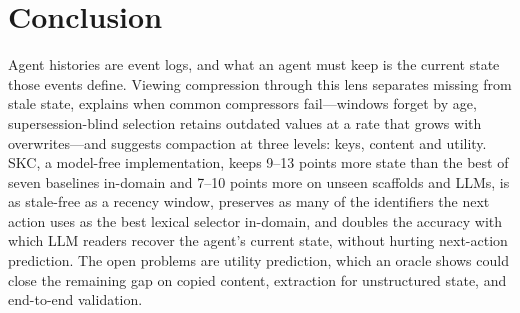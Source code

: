 \section{Conclusion}

Agent histories are event logs, and what an agent must keep is the current state
those events define. Viewing compression through this lens separates missing
from stale state, explains when common compressors fail---windows forget by age,
supersession-blind selection retains outdated values at a rate that grows with
overwrites---and suggests compaction at three levels: keys, content and
utility. SKC, a model-free implementation, keeps 9--13 points more state than the
best of seven baselines in-domain and 7--10 points more on unseen scaffolds and
LLMs, is as stale-free as a recency window, preserves as many of the identifiers
the next action uses as the best lexical selector in-domain, and doubles the
accuracy with which LLM readers recover the agent's current state, without
hurting next-action prediction. The open problems are utility prediction, which an oracle shows
could close the remaining gap on copied content, extraction for unstructured
state, and end-to-end validation.
